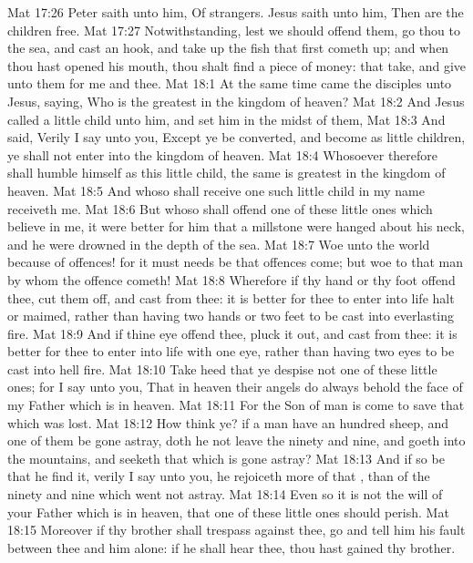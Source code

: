 \vs Mat 17:26 Peter saith unto him, Of strangers. Jesus saith unto him, Then are the children free.
\vs Mat 17:27 Notwithstanding, lest we should offend them, go thou to the sea, and cast an hook, and take up the fish that first cometh up; and when thou hast opened his mouth, thou shalt find a piece of money: that take, and give unto them for me and thee.
\vs Mat 18:1 At the same time came the disciples unto Jesus, saying, Who is the greatest in the kingdom of heaven?
\vs Mat 18:2 And Jesus called a little child unto him, and set him in the midst of them,
\vs Mat 18:3 And said, Verily I say unto you, Except ye be converted, and become as little children, ye shall not enter into the kingdom of heaven.
\vs Mat 18:4 Whosoever therefore shall humble himself as this little child, the same is greatest in the kingdom of heaven.
\vs Mat 18:5 And whoso shall receive one such little child in my name receiveth me.
\vs Mat 18:6 But whoso shall offend one of these little ones which believe in me, it were better for him that a millstone were hanged about his neck, and  he were drowned in the depth of the sea.
\vs Mat 18:7 Woe unto the world because of offences! for it must needs be that offences come; but woe to that man by whom the offence cometh!
\vs Mat 18:8 Wherefore if thy hand or thy foot offend thee, cut them off, and cast  from thee: it is better for thee to enter into life halt or maimed, rather than having two hands or two feet to be cast into everlasting fire.
\vs Mat 18:9 And if thine eye offend thee, pluck it out, and cast  from thee: it is better for thee to enter into life with one eye, rather than having two eyes to be cast into hell fire.
\vs Mat 18:10 Take heed that ye despise not one of these little ones; for I say unto you, That in heaven their angels do always behold the face of my Father which is in heaven.
\vs Mat 18:11 For the Son of man is come to save that which was lost.
\vs Mat 18:12 How think ye? if a man have an hundred sheep, and one of them be gone astray, doth he not leave the ninety and nine, and goeth into the mountains, and seeketh that which is gone astray?
\vs Mat 18:13 And if so be that he find it, verily I say unto you, he rejoiceth more of that , than of the ninety and nine which went not astray.
\vs Mat 18:14 Even so it is not the will of your Father which is in heaven, that one of these little ones should perish.
\vs Mat 18:15 Moreover if thy brother shall trespass against thee, go and tell him his fault between thee and him alone: if he shall hear thee, thou hast gained thy brother.
